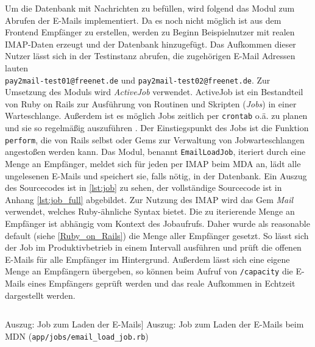 Um die Datenbank mit Nachrichten zu befüllen, wird folgend das Modul zum Abrufen der E-Mails implementiert. Da es noch nicht möglich ist aus dem Frontend Empfänger zu erstellen, werden zu Beginn Beispielnutzer mit realen IMAP-Daten erzeugt und der Datenbank hinzugefügt. Das Aufkommen dieser Nutzer lässt sich in der Testinstanz abrufen, die zugehörigen E-Mail Adressen lauten \\ \texttt{pay2mail-test01@freenet.de} und \texttt{pay2mail-test02@freenet.de}. Zur Umsetzung des Moduls wird \textit{ActiveJob} verwendet. ActiveJob ist ein Bestandteil von Ruby on Rails zur Ausführung von Routinen und Skripten (\textit{Jobs}) in einer Warteschlange. Außerdem ist es möglich Jobs zeitlich per \texttt{crontab} o.ä. zu planen und sie so regelmäßig auszuführen \citep{Hansson2022b}. Der Einstiegspunkt des Jobs ist die Funktion \texttt{perform}, die von Rails selbst oder Gems zur Verwaltung von Jobwarteschlangen angestoßen werden kann. Das Modul, benannt \texttt{EmailLoadJob}, iteriert durch eine Menge an Empfänger, meldet sich für jeden per IMAP beim MDA an, lädt alle ungelesenen E-Mails und speichert sie, falls nötig, in der Datenbank. Ein Auszug des Sourcecodes ist in \ref{lst:job} zu sehen, der vollständige Sourcecode ist in Anhang \ref{lst:job_full} abgebildet. Zur Nutzung des IMAP wird das Gem \textit{Mail} verwendet, welches Ruby-ähnliche Syntax bietet. Die zu iterierende Menge an Empfänger ist abhängig vom Kontext des Jobaufrufs. Daher wurde als reasonable default (siehe \ref{Ruby_on_Rails}) die Menge aller Empfänger gesetzt. So lässt sich der Job im Produktivbetrieb in einem Intervall ausführen und prüft die offenen E-Mails für alle Empfänger im Hintergrund. Außerdem lässt sich eine eigene Menge an Empfängern übergeben, so können beim Aufruf von \texttt{/capacity} die E-Mails eines Empfängers geprüft werden und das reale Aufkommen in Echtzeit dargestellt werden.

\begin{listing}[!ht]
\inputminted[firstline=4, lastline=11,linenos]{ruby}{Listings/Pkg1/email_load_job.rb}

\caption
    [Auszug: Job zum Laden der E-Mails]
    {Auszug: Job zum Laden der E-Mails beim MDN (\texttt{app/jobs/email\_load\_job.rb})}

\label{lst:job}
\end{listing}

